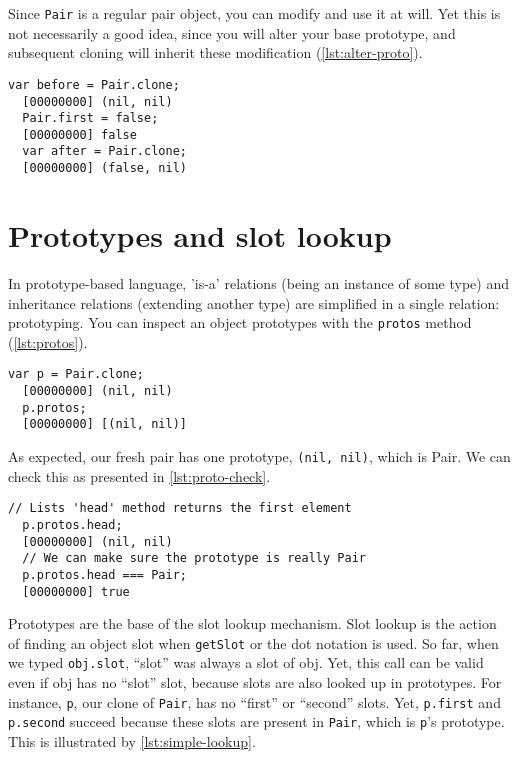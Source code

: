 \documentclass[openright,twoside,12pt]{report}
\begin{document}
Since \lstinline|Pair| is a regular pair object, you can modify and
use it at will. Yet this is not necessarily a good idea, since you
will alter your base prototype, and subsequent cloning will inherit
these modification (\autoref{lst:alter-proto}).

\begin{lstlisting}[caption=Altering a prototype, label=lst:alter-proto]
  var before = Pair.clone;
  [00000000] (nil, nil)
  Pair.first = false;
  [00000000] false
  var after = Pair.clone;
  [00000000] (false, nil)
\end{lstlisting}

\section{Prototypes and slot lookup}

In prototype-based language, 'is-a' relations (being an instance of
some type) and inheritance relations (extending another type) are
simplified in a single relation: prototyping. You can inspect an
object prototypes with the \texttt{protos} method (\autoref{lst:protos}).

\begin{lstlisting}[caption=Inspecting prototypes, label=lst:protos]
  var p = Pair.clone;
  [00000000] (nil, nil)
  p.protos;
  [00000000] [(nil, nil)]
\end{lstlisting}

As expected, our fresh pair has one prototype, \lstinline|(nil, nil)|,
which is Pair. We can check this as presented in \autoref{lst:proto-check}.

\begin{lstlisting}[caption=Checking the prototype, label=lst:proto-check]
  // Lists 'head' method returns the first element
  p.protos.head;
  [00000000] (nil, nil)
  // We can make sure the prototype is really Pair
  p.protos.head === Pair;
  [00000000] true
\end{lstlisting}

Prototypes are the base of the slot lookup mechanism. Slot lookup is
the action of finding an object slot when \texttt{getSlot} or the dot
notation is used. So far, when we typed \lstinline|obj.slot|, ``slot''
was always a slot of obj. Yet, this call can be valid even if obj has
no ``slot'' slot, because slots are also looked up in prototypes. For
instance, \lstinline|p|, our clone of \lstinline|Pair|, has no
``first'' or ``second'' slots. Yet, \lstinline|p.first| and
\lstinline|p.second| succeed because these slots are present in
\lstinline|Pair|, which is \lstinline|p|'s prototype. This is
illustrated by \autoref{lst:simple-lookup}.
\end{document}
